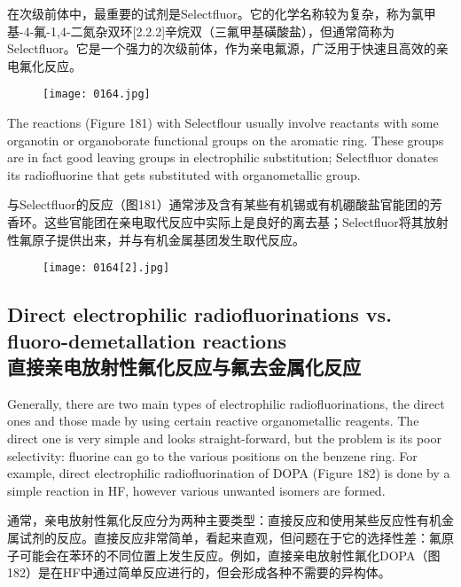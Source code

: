 \documentclass[dvipsnames, svgnames,a4paper,11pt]{article}
\begin{document}
在次级前体中，最重要的试剂是Selectfluor。它的化学名称较为复杂，称为氯甲基-4-氟-1,4-二氮杂双环[2.2.2]辛烷双（三氟甲基磺酸盐），但通常简称为Selectfluor。它是一个强力的次级前体，作为亲电氟源，广泛用于快速且高效的亲电氟化反应。

\begin{figure}[h]
	\centering
    \texttt{[image: 0164.jpg]}    
     \label{fig180}
\end{figure}

The reactions (Figure 181) with Selectflour usually involve reactants with some
organotin or organoborate functional groups on the aromatic ring. These groups are
in fact good leaving groups in electrophilic substitution; Selectfluor donates its
radiofluorine that gets substituted with organometallic group.

与Selectfluor的反应（图181）通常涉及含有某些有机锡或有机硼酸盐官能团的芳香环。这些官能团在亲电取代反应中实际上是良好的离去基；Selectfluor将其放射性氟原子提供出来，并与有机金属基团发生取代反应。

\begin{figure}[h]
	\centering
    \texttt{[image: 0164[2].jpg]}    
     \label{fig181}
\end{figure}
\subsection{Direct electrophilic radiofluorinations vs. fluoro-demetallation reactions \\直接亲电放射性氟化反应与氟去金属化反应}

Generally, there are two main types of electrophilic radiofluorinations, the direct ones
and those made by using certain reactive organometallic reagents. The direct one is
very simple and looks straight-forward, but the problem is its poor selectivity: fluorine
can go to the various positions on the benzene ring. For example, direct electrophilic
radiofluorination of DOPA (Figure 182) is done by a simple reaction in HF, however
various unwanted isomers are formed.

通常，亲电放射性氟化反应分为两种主要类型：直接反应和使用某些反应性有机金属试剂的反应。直接反应非常简单，看起来直观，但问题在于它的选择性差：氟原子可能会在苯环的不同位置上发生反应。例如，直接亲电放射性氟化DOPA（图182）是在HF中通过简单反应进行的，但会形成各种不需要的异构体。
\end{document}
